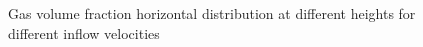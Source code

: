 \documentclass[11pt,a4paper]{article}
\begin{document}
\begin{figure}[H]
    \centering
    \caption[]{Gas volume fraction horizontal distribution at different heights for different inflow velocities}
    \label{fig:alpha_inflow_velocities}
\end{figure}


\end{document}
